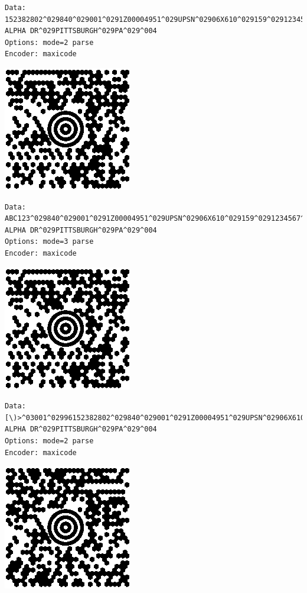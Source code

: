 \begin{verbatim}
Data:    152382802^029840^029001^0291Z00004951^029UPSN^02906X610^029159^0291234567^0291/1^029^029Y^029634 ALPHA DR^029PITTSBURGH^029PA^029^004
Options: mode=2 parse
Encoder: maxicode
\end{verbatim}

\includegraphics{images/maxicode-2.eps}

\begin{verbatim}
Data:    ABC123^029840^029001^0291Z00004951^029UPSN^02906X610^029159^0291234567^0291/1^029^029Y^029634 ALPHA DR^029PITTSBURGH^029PA^029^004
Options: mode=3 parse
Encoder: maxicode
\end{verbatim}

\includegraphics{images/maxicode-3.eps}

\begin{verbatim}
Data:    [\)>^03001^02996152382802^029840^029001^0291Z00004951^029UPSN^02906X610^029159^0291234567^0291/1^029^029Y^029634 ALPHA DR^029PITTSBURGH^029PA^029^004
Options: mode=2 parse
Encoder: maxicode
\end{verbatim}

\includegraphics{images/maxicode-4.eps}

